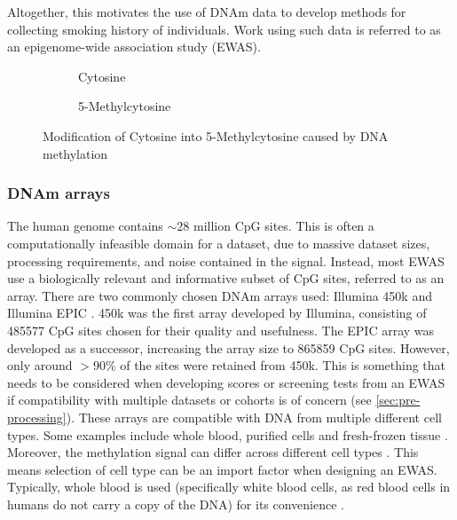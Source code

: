 \documentclass[draft]{article}
\begin{document}
Altogether, this motivates the use of DNAm data to develop methods for collecting smoking history of individuals. Work using such data is referred to as an epigenome-wide association study (EWAS).

\begin{figure}
    \begin{subfigure}{0.49\textwidth}
        \centering
        \hspace*{11mm}
        \vspace{3mm}
        \caption{Cytosine}
    \end{subfigure}
    \begin{subfigure}{0.49\textwidth}
        \centering
        \vspace{3mm}
        \caption{5-Methylcytosine}
    \end{subfigure}
    \caption*{Modification of Cytosine into 5-Methylcytosine caused by DNA methylation}
\end{figure}

\subsubsection{DNAm arrays}
The human genome contains \(\sim\!28\) million CpG sites. This is often a computationally infeasible domain for a dataset, due to massive dataset sizes, processing requirements, and noise contained in the signal. Instead, most EWAS use a biologically relevant and informative subset of CpG sites, referred to as an array. There are two commonly chosen DNAm arrays used: Illumina 450k \cite{illumina2012methylation450} and Illumina EPIC \cite{illumina2015methylationepic}. 450k was the first array developed by Illumina, consisting of \num{485577} CpG sites chosen for their quality and usefulness. The EPIC array was developed as a successor, increasing the array size to \num{865859} CpG sites. However, only around \(>90\%\) of the sites were retained from 450k. This is something that needs to be considered when developing scores or screening tests from an EWAS if compatibility with multiple datasets or cohorts is of concern (see \ref{sec:pre-processing}). These arrays are compatible with DNA from multiple different cell types. Some examples include whole blood, purified cells and fresh-frozen tissue \cite{bhat2022data}. Moreover, the methylation signal can differ across different cell types \cite{huang2016epigenome}. This means selection of cell type can be an import factor when designing an EWAS. Typically, whole blood is used (specifically white blood cells, as red blood cells in humans do not carry a copy of the DNA) for its convenience \cite{houseman2015dna}.
\end{document}
